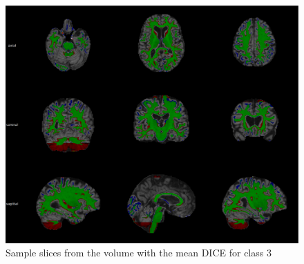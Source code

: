 \documentclass[msc]{infthesis}
\begin{document}
\begin{figure}[ht]
  \centering
  \includegraphics[width=\textwidth]{images/class_3_mean}
  \caption{Sample slices from the volume with the mean DICE for class 3}
  \label{fig:overall-mean-3}
\end{figure}





\end{document}
